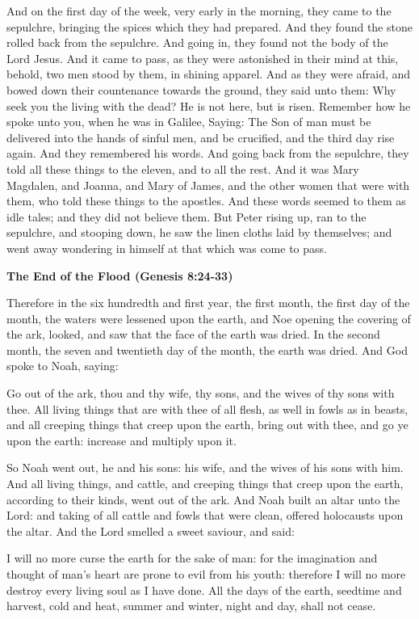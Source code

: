 And on the first day of the week, very early in the morning, they came to the sepulchre, bringing the spices which they
had prepared. And they found the stone rolled back from the sepulchre. And going in, they found not the body of the
Lord Jesus. And it came to pass, as they were astonished in their mind at this, behold, two men stood by them, in
shining apparel. And as they were afraid, and bowed down their countenance towards the ground, they said unto them: Why
seek you the living with the dead? He is not here, but is risen. Remember how he spoke unto you, when he was in
Galilee, Saying: The Son of man must be delivered into the hands of sinful men, and be crucified, and the third day
rise again. And they remembered his words. And going back from the sepulchre, they told all these things to the eleven,
and to all the rest. And it was Mary Magdalen, and Joanna, and Mary of James, and the other women that were with them,
who told these things to the apostles. And these words seemed to them as idle tales; and they did not believe them. But
Peter rising up, ran to the sepulchre, and stooping down, he saw the linen cloths laid by themselves; and went away
wondering in himself at that which was come to pass.

\textbf{The End of the Flood (Genesis 8:24-33)}

Therefore in the six hundredth and first year, the first month, the first day of the month, the waters were lessened
upon the earth, and Noe opening the covering of the ark, looked, and saw that the face of the earth was dried. In the
second month, the seven and twentieth day of the month, the earth was dried. And God spoke to Noah, saying:

Go out of the ark, thou and thy wife, thy sons, and the wives of thy sons with thee. All living things that are with
thee of all flesh, as well in fowls as in beasts, and all creeping things that creep upon the earth, bring out with
thee, and go ye upon the earth: increase and multiply upon it.

So Noah went out, he and his sons: his wife, and the wives of his sons with him. And all living things, and cattle, and
creeping things that creep upon the earth, according to their kinds, went out of the ark. And Noah built an altar unto
the Lord: and taking of all cattle and fowls that were clean, offered holocausts upon the altar. And the Lord smelled a
sweet saviour, and said:

I will no more curse the earth for the sake of man: for the imagination and thought of man's heart
are prone to evil from his youth: therefore I will no more destroy every living soul as I have done. All the days of
the earth, seedtime and harvest, cold and heat, summer and winter, night and day, shall not cease.

